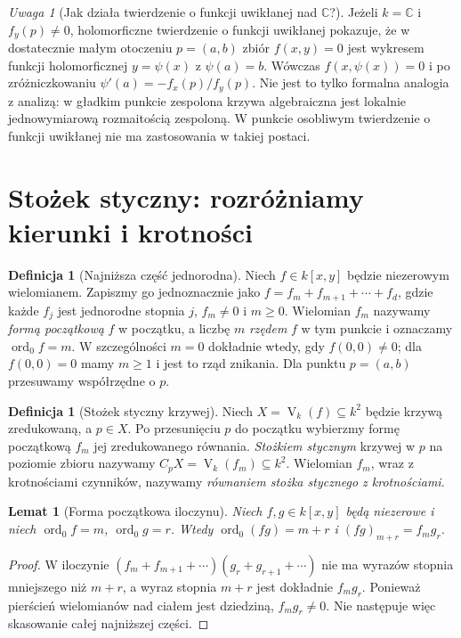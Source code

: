 \documentclass[11pt,a4paper,openany]{report}
\numberwithin{equation}{section}
\theoremstyle{plain}
\newtheorem{lemat}[twierdzenie]{Lemat}
\theoremstyle{definition}
\newtheorem{definicja}[twierdzenie]{Definicja}
\theoremstyle{remark}
\newtheorem{uwaga}[twierdzenie]{Uwaga}
\newcommand{\C}{\mathbb C}
\newcommand{\V}{\operatorname V}
\begin{document}
\begin{uwaga}[Jak działa twierdzenie o funkcji uwikłanej nad $\C$?]
Jeżeli $k=\C$ i $f_y(p)\ne0$, holomorficzne twierdzenie
o funkcji uwikłanej pokazuje, że w dostatecznie małym
otoczeniu $p=(a,b)$ zbiór $f(x,y)=0$ jest wykresem
funkcji holomorficznej $y=\psi(x)$ z $\psi(a)=b$.
Wówczas $f(x,\psi(x))=0$ i po zróżniczkowaniu
$\psi'(a)=-f_x(p)/f_y(p)$. Nie jest to tylko formalna
analogia z analizą: w gładkim punkcie zespolona krzywa
algebraiczna jest lokalnie jednowymiarową rozmaitością
zespoloną. W punkcie osobliwym twierdzenie o funkcji
uwikłanej nie ma zastosowania w takiej postaci.
\end{uwaga}

\section{Stożek styczny: rozróżniamy kierunki i krotności}

\begin{definicja}[Najniższa część jednorodna]
Niech $f\in k[x,y]$ będzie niezerowym wielomianem.
Zapiszmy go jednoznacznie jako
$f=f_m+f_{m+1}+\cdots+f_d$, gdzie każde $f_j$
jest jednorodne stopnia $j$, $f_m\ne0$ i $m\ge0$.
Wielomian $f_m$ nazywamy \emph{formą początkową} $f$
w początku, a liczbę $m$ \emph{rzędem} $f$
w tym punkcie i oznaczamy $\operatorname{ord}_0f=m$.
W szczególności $m=0$ dokładnie wtedy, gdy $f(0,0)\ne0$;
dla $f(0,0)=0$ mamy $m\ge1$ i jest to rząd znikania.
Dla punktu $p=(a,b)$ przesuwamy współrzędne o $p$.
\end{definicja}

\begin{definicja}[Stożek styczny krzywej]
Niech $X=\V_k(f)\subseteq k^2$ będzie krzywą zredukowaną,
a $p\in X$. Po przesunięciu $p$ do początku wybierzmy
formę początkową $f_m$ jej zredukowanego równania.
\emph{Stożkiem stycznym} krzywej w $p$ na poziomie zbioru
nazywamy $C_pX=\V_k(f_m)\subseteq k^2$.
Wielomian $f_m$, wraz z krotnościami czynników,
nazywamy \emph{równaniem stożka stycznego z krotnościami}.
\end{definicja}

\begin{lemat}[Forma początkowa iloczynu]
Niech $f,g\in k[x,y]$ będą niezerowe i niech
$\operatorname{ord}_0f=m$, $\operatorname{ord}_0g=r$.
Wtedy $\operatorname{ord}_0(fg)=m+r$ i
$(fg)_{m+r}=f_mg_r$.
\end{lemat}
\begin{proof}
W iloczynie $(f_m+f_{m+1}+\cdots)(g_r+g_{r+1}+\cdots)$
nie ma wyrazów stopnia mniejszego niż $m+r$,
a wyraz stopnia $m+r$ jest dokładnie $f_mg_r$.
Ponieważ pierścień wielomianów nad ciałem jest dziedziną,
$f_mg_r\ne0$. Nie następuje więc skasowanie całej
najniższej części.
\end{proof}
\end{document}
